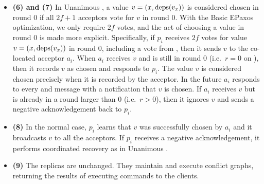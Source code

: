 \begin{itemize}
  \item \textbf{(6) and (7)}
    \change{} In Unanimous \BPaxos{}, a value $v = (x, \text{deps}(v_x))$ is
    considered chosen in round $0$ if all $2f+1$ acceptors vote for $v$ in
    round $0$. With the Basic EPaxos optimization, we only require $2f$ votes,
    and the act of choosing a value in round $0$ is made more explicit.
    Specifically, if $p_i$ receives $2f$ votes for value $v = (x, \text{deps}(v_x))$
    in round $0$, including a vote from , then it sends
    $v$ to the co-located acceptor $a_i$. When $a_i$ receives $v$ and is still
    in round $0$ (i.e.\ $r = 0$ on 
    ), then it records $v$ as chosen and responds to
    $p_i$. The value $v$ is considered chosen precisely when it is recorded by
    the acceptor. In the future $a_i$ responds to every  and
     message with a notification that $v$ is chosen. If $a_i$
    receives $v$ but is already in a round larger than $0$ (i.e.\ $r > 0$),
    then it ignores $v$ and sends a negative acknowledgement back to $p_i$.

  \item \textbf{(8)}
    In the normal case, $p_i$ learns that $v$ was successfully chosen by $a_i$
    and it broadcasts $v$ to all the acceptors. If $p_i$ receives a negative
    acknowledgement, it performs coordinated recovery as in Unanimous
    \BPaxos{}.

  \item \textbf{(9)}
    The replicas are unchanged. They maintain and execute conflict graphs,
    returning the results of executing commands to the clients.
\end{itemize}

